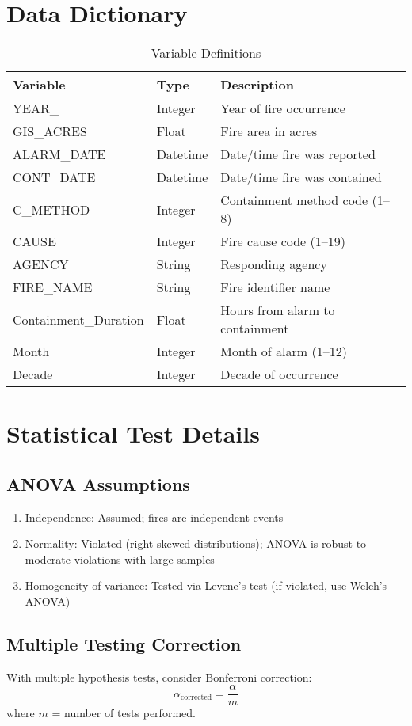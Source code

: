 \documentclass[12pt,a4paper]{article}
\begin{document}



\appendix

\section{Data Dictionary}

\begin{table}[h]
\centering
\caption{Variable Definitions}
\begin{tabular}{lll}
\toprule
\textbf{Variable} & \textbf{Type} & \textbf{Description} \\
\midrule
YEAR\_ & Integer & Year of fire occurrence \\
GIS\_ACRES & Float & Fire area in acres \\
ALARM\_DATE & Datetime & Date/time fire was reported \\
CONT\_DATE & Datetime & Date/time fire was contained \\
C\_METHOD & Integer & Containment method code (1--8) \\
CAUSE & Integer & Fire cause code (1--19) \\
AGENCY & String & Responding agency \\
FIRE\_NAME & String & Fire identifier name \\
Containment\_Duration & Float & Hours from alarm to containment \\
Month & Integer & Month of alarm (1--12) \\
Decade & Integer & Decade of occurrence \\
\bottomrule
\end{tabular}
\end{table}

\section{Statistical Test Details}

\subsection{ANOVA Assumptions}

\begin{enumerate}
    \item Independence: Assumed; fires are independent events
    \item Normality: Violated (right-skewed distributions); ANOVA is robust to moderate violations with large samples
    \item Homogeneity of variance: Tested via Levene's test (if violated, use Welch's ANOVA)
\end{enumerate}

\subsection{Multiple Testing Correction}

With multiple hypothesis tests, consider Bonferroni correction:
\begin{equation}
\alpha_{\text{corrected}} = \frac{\alpha}{m}
\end{equation}
where $m$ = number of tests performed.
\end{document}
